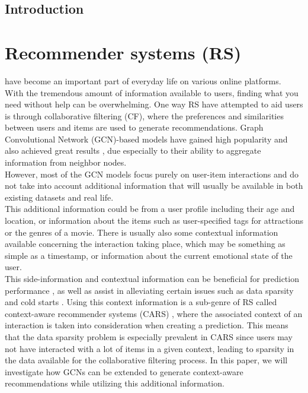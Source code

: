 \noindent
\section{Introduction}
\chapter{Recommender systems (RS)}\label{ch:introduction}
have become an important part of everyday life on various online platforms.
\\
With the tremendous amount of information available to users, finding what you need without help can be overwhelming.
One way RS have attempted to aid users is through collaborative filtering (CF), where the preferences and similarities between users and items are used to generate recommendations. 
Graph Convolutional Network (GCN)-based models have gained high popularity and also achieved great results \cite{NGCF,LightGCN,KGAT}, due especially to their ability to aggregate information from neighbor nodes.\\
However, most of the GCN models focus purely on user-item interactions and do not take into account additional information that will usually be available in both existing datasets and real life.
\\
This additional information could be from a user profile including their age and location, or information about the items such as user-specified tags for attractions or the genres of a movie.
There is usually also some contextual information available concerning the interaction taking place, which may be something as simple as a timestamp, or information about the current emotional state of the user.\\
This side-information and contextual information can be beneficial for prediction performance \cite{ContextImportance2,ContextImportance3}, as well as assist in alleviating certain issues such as data sparsity and cold starts \cite{SideInfoDefinition}.
Using this context information is a sub-genre of RS called context-aware recommender systems (CARS) \cite{carsprogress}, where the associated context of an interaction is taken into consideration when creating a prediction.
This means that the data sparsity problem is especially prevalent in CARS since users may not have interacted with a lot of items in a given context, leading to sparsity in the data available for the collaborative filtering process.
In this paper, we will investigate how GCNs can be extended to generate context-aware recommendations while utilizing this additional information.
